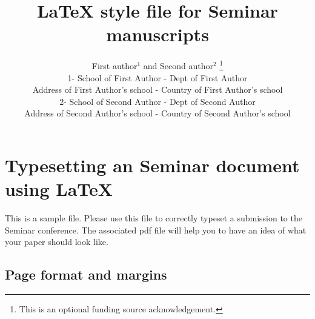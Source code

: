 \documentclass{SeminarV2}
\begin{document}
\title{LaTeX style file for Seminar manuscripts}

\author{First author$^1$ and Second author$^2$
%
\thanks{This is an optional funding source acknowledgement.}
%
\vspace{.3cm}\\
%
1- School of First Author - Dept of First Author \\
Address of First Author's school - Country of First Author's
school
%
\vspace{.1cm}\\
2- School of Second Author - Dept of Second Author \\
Address of Second Author's school - Country of Second Author's school\\
}

\maketitle

\begin{abstract}

\end{abstract}

\section{Typesetting an Seminar document using \LaTeX}

This is a sample file. Please use this file to correctly typeset a
submission to the Seminar conference. The associated pdf file will
help you to have an idea of what your paper should look like.

\subsection{Page format and margins}

\end{document}
